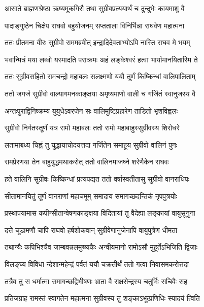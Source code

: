 \twolineshloka
{आसाते ब्राह्मणश्रेष्ठा ऋष्यमूकगिरौ तथा}
{सुग्रीवप्रत्ययार्थं च दुन्दुभेः कायमाशु वै}%

\twolineshloka
{पादाङ्गुष्ठेन चिक्षेप राघवो बहुयोजनम्}
{सप्तताला विनिर्भिन्ना राघवेण महात्मना}%

\twolineshloka
{ततः प्रीतमना वीरः सुग्रीवो राममब्रवीत्}
{इन्द्रादिदेवताभ्योऽपि नास्ति राघव मे भयम्}%

\twolineshloka
{भवान्मित्रं मया लब्धो यस्मादति पराक्रमः}
{अहं लङ्केश्वरं हत्वा भार्यामानयितास्मि ते}%

\twolineshloka
{ततः सुग्रीवसहितो रामचन्द्रो महाबलः}
{सलक्ष्मणो ययौ तूर्णं किष्किन्धां वालिपालिताम्}%

\twolineshloka
{ततो जगर्ज सुग्रीवो वाल्यागमनकाङ्क्षया}
{अमृष्यमाणो वाली च गर्जितं स्वानुजस्य वै}%

\twolineshloka
{अन्तःपुराद्विनिष्क्रम्य युयुधेऽवरजेन सः}
{वालिमुष्टिप्रहारेण ताडितो भृशविह्वलः}%

\twolineshloka
{सुग्रीवो निर्गतस्तूर्णं यत्र रामो महाबलः}
{ततो रामो महाबाहुस्सुग्रीवस्य शिरोधरे}%

\twolineshloka
{लतामाबध्य चिह्नं तु युद्धायाचोदयत्तदा}
{गर्जितेन समाहूय सुग्रीवो वालिनं पुनः}%

\twolineshloka
{रामप्रेरणया तेन बाहुयुद्धमथाकरोत्}
{ततो वालिनमाजघ्ने शरेणैकेन राघवः}%

\twolineshloka
{हते वालिनि सुग्रीवः किष्किन्धां प्रत्यपद्यत}
{ततो वर्षास्वतीतासु सुग्रीवो वानराधिपः}%

\twolineshloka
{सीतामानयितुं तूर्णं वानराणां महाचमूम्}
{समादाय समागच्छदन्तिकं नृपपुत्रयोः}%

\twolineshloka
{प्रस्थापयामास कपीन्सीतान्वेषणकाङ्क्षया}
{विदितायां तु वैदेह्या लङ्कायां वायुसूनुना}%

\twolineshloka
{दत्ते चूडामणौ चापि राघवो हर्षशोकवान्}
{सुग्रीवेणानुजेनापि वायुपुत्रेण धीमता}%

\twolineshloka
{तथान्यैः कपिभिश्चैव जाम्बवन्नलमुख्यकैः}
{अन्वीयमानो रामोऽसौ मुहूर्तेऽभिजिति द्विजाः}%

\twolineshloka
{विलङ्घ्य विविधा न्देशान्महेन्द्रं पर्वतं ययौ}
{चक्रतीर्थं ततो गत्वा निवासमकरोत्तदा}%

\twolineshloka
{तत्रैव तु स धर्मात्मा समागच्छद्विभीषणः}
{भ्राता वै राक्षसेन्द्रस्य चतुर्भिः सचिवैः सह}%

\twolineshloka
{प्रतिजग्राह रामस्तं स्वागतेन महात्मना}
{सुग्रीवस्य तु शङ्काऽभूत्प्रणिधिः स्यादयं त्विति}%

